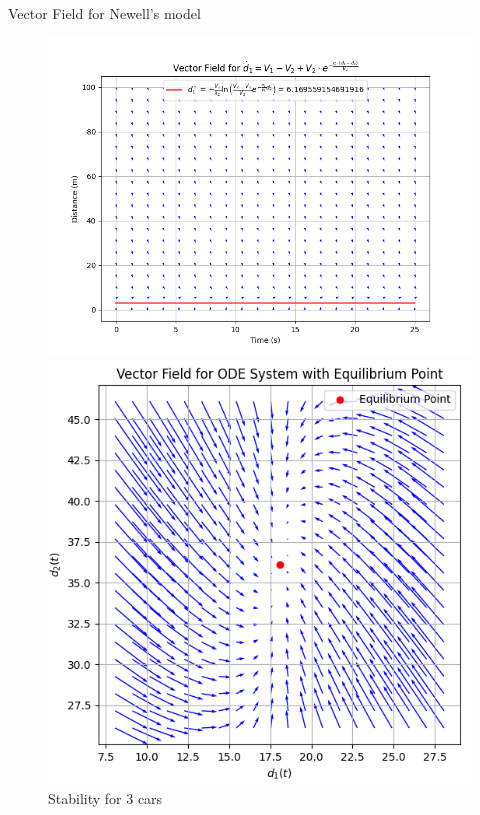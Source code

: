 \documentclass{beamer}
\begin{document}
\begin{frame}{Vector Field for Newell's model}
	\begin{figure}[H]
		\centering
		\begin{minipage}[t]{0.53\textwidth}
				\centering
				\includegraphics[width=\linewidth]{VectorFIeld.png}
				\caption{Stability for 2 cars}
		\end{minipage}
		\hfill 
		\begin{minipage}[t]{0.44\textwidth}
			\centering
			\includegraphics[width=0.9\linewidth]{FieldOfVector_CV2.png}
			\caption{Stability for 3 cars}
			\label{fig:FV1}
		\end{minipage}
		\label{fig:CombinedFigures}
	\end{figure}
\end{frame}
\end{document}
